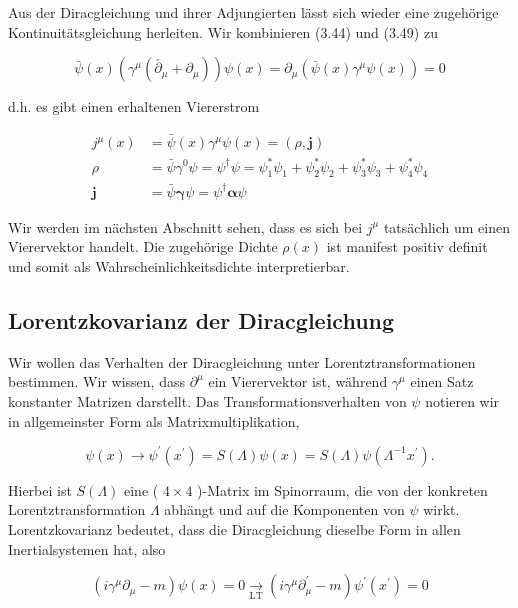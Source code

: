 \documentclass[10pt, letterpaper]{article}
\begin{document}
Aus der Diracgleichung und ihrer Adjungierten lässt sich wieder eine zugehörige Kontinuitätsgleichung herleiten. Wir kombinieren (3.44) und (3.49) zu

$$
\bar{\psi}(x)\left(\gamma^{\mu}\left(\overleftarrow{\partial_{\mu}}+\partial_{\mu}\right)\right) \psi(x)=\partial_{\mu}\left(\bar{\psi}(x) \gamma^{\mu} \psi(x)\right)=0
$$

d.h. es gibt einen erhaltenen Viererstrom

$$
\begin{aligned}
j^{\mu}(x) & =\bar{\psi}(x) \gamma^{\mu} \psi(x)=(\rho, \mathbf{j}) \\
\rho & =\bar{\psi} \gamma^{0} \psi=\psi^{\dagger} \psi=\psi_{1}^{*} \psi_{1}+\psi_{2}^{*} \psi_{2}+\psi_{3}^{*} \psi_{3}+\psi_{4}^{*} \psi_{4} \\
\mathbf{j} & =\bar{\psi} \boldsymbol{\gamma} \psi=\psi^{\dagger} \boldsymbol{\alpha} \psi
\end{aligned}
$$

Wir werden im nächsten Abschnitt sehen, dass es sich bei $j^{\mu}$ tatsächlich um einen Vierervektor handelt. Die zugehörige Dichte $\rho(x)$ ist manifest positiv definit und somit als Wahrscheinlichkeitsdichte interpretierbar.


\pagebreak

\subsection{Lorentzkovarianz der Diracgleichung}


Wir wollen das Verhalten der Diracgleichung unter Lorentztransformationen bestimmen. Wir wissen, dass $\partial^{\mu}$ ein Vierervektor ist, während $\gamma^{\mu}$ einen Satz konstanter Matrizen darstellt. Das Transformationsverhalten von $\psi$ notieren wir in allgemeinster Form als Matrixmultiplikation,

$$
\psi(x) \longrightarrow \psi^{\prime}\left(x^{\prime}\right)=S(\Lambda) \psi(x)=S(\Lambda) \psi\left(\Lambda^{-1} x^{\prime}\right) .
$$

Hierbei ist $S(\Lambda)$ eine ( $4 \times 4$ )-Matrix im Spinorraum, die von der konkreten Lorentztransformation $\Lambda$ abhängt und auf die Komponenten von $\psi$ wirkt. Lorentzkovarianz bedeutet, dass die Diracgleichung dieselbe Form in allen Inertialsystemen hat, also

$$
\left(i \gamma^{\mu} \partial_{\mu}-m\right) \psi(x)=0 \underset{\mathrm{LT}}{\longrightarrow}\left(i \gamma^{\mu} \partial_{\mu}^{\prime}-m\right) \psi^{\prime}\left(x^{\prime}\right)=0
$$
\end{document}
